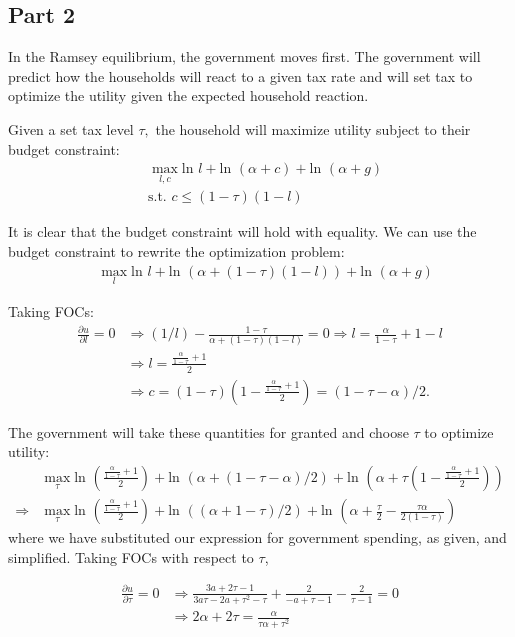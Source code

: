 \documentclass[11pt]{article} %
\begin{document}
\subsection{Part 2}
In the Ramsey equilibrium, the government moves first. The government will predict how the households will react to a given tax rate and will set tax to optimize the utility given the expected household reaction. 

Given a set tax level $\tau,$ the household will maximize utility subject to their budget constraint:
\begin{align*}
&\max_{l,c} \text{ln }l +\text{ln }(\alpha + c) +\text{ln }(\alpha + g)\\
&\text{s.t. } c \leq (1-\tau)(1-l)
\end{align*}

It is clear that the budget constraint will hold with equality. We can use the budget constraint to rewrite the optimization problem:
\begin{align*}
&\max_{l} \text{ln }l +\text{ln }(\alpha + (1-\tau)(1-l)) +\text{ln }(\alpha + g)
\end{align*}

Taking FOCs:
\begin{align*}
\frac{\partial u}{\partial l} = 0 &\Rightarrow  (1/l) - \frac{1-\tau}{\alpha +(1-\tau)(1-l)} = 0 \Rightarrow l = \frac{\alpha}{1-\tau} + 1 - l \\
&\Rightarrow l = \frac{\frac{\alpha}{1-\tau} +1}{2}\\
&\Rightarrow c =(1-\tau)\left(1- \frac{\frac{\alpha}{1-\tau} +1}{2} \right) = (1 - \tau - \alpha)/2.
\end{align*}

The government will take these quantities for granted and choose $\tau$ to optimize utility:
\begin{align*}
&\max_{\tau} \text{ln }\left( \frac{\frac{\alpha}{1-\tau} +1}{2}\right) +\text{ln }\left(\alpha + (1-\tau - \alpha)/2\right) +\text{ln }\left(\alpha + \tau\left(1- \frac{\frac{\alpha}{1-\tau} +1}{2} \right)\right)\\
\Rightarrow &\max_{\tau} \text{ln }\left( \frac{\frac{\alpha}{1-\tau} +1}{2}\right) +\text{ln }\left((\alpha +1 - \tau )/2\right) +  \text{ln }\left(\alpha + \frac{\tau}{2} - \frac{\tau\alpha}{2(1-\tau)} \right)
\end{align*}
where we have substituted our expression for government spending, as given, and simplified. Taking FOCs with respect to $\tau$,

\begin{align*}
\frac{\partial u}{\partial \tau} = 0 &\Rightarrow  \frac{3a+2\tau -1}{3a\tau - 2a + \tau^2 - \tau} + \frac{2}{-a+\tau -1} - \frac{2}{\tau-1} = 0\\%
&\Rightarrow 2\alpha +2\tau = \frac{\alpha}{\tau\alpha +\tau^2}
\end{align*}
\end{document}
